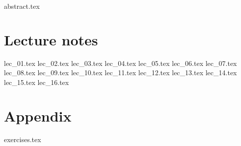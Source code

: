 \documentclass[fancyfoot, git]{mkessler-script}
\author{Simon (Morpheus) Cyrani}
\begin{document}
\maketitle

{abstract.tex}

\cleardoublepage
\tableofcontents

\cleardoublepage
\summaryoflectures

\cleardoublepage
\part{Lecture notes}
{lec_01.tex}
{lec_02.tex}
{lec_03.tex}
{lec_04.tex}
{lec_05.tex}
{lec_06.tex}
{lec_07.tex}
{lec_08.tex}
{lec_09.tex}
{lec_10.tex}
{lec_11.tex}
{lec_12.tex}
{lec_13.tex}
{lec_14.tex}
{lec_15.tex}
{lec_16.tex}


\cleardoublepage
\appendix
\part{Appendix}

{exercises.tex}

\cleardoublepage

\cleardoublepage
\printvocabindex

\cleardoublepage
\printimageattributions

\cleardoublepage
\printliterature
\end{document}
